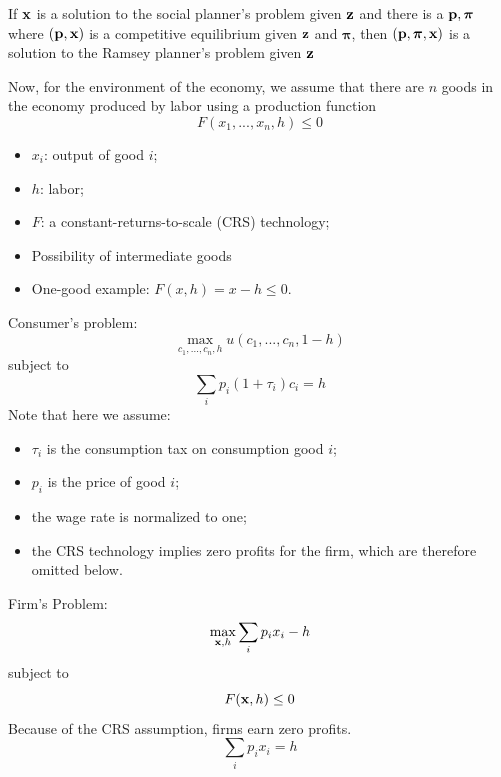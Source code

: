 \documentclass[12pt]{article}
\begin{document}
	\begin{proposition}
		If $\bold{x}$ is a solution to the social planner's problem given $\bold{z}$ and there is a $\bold{p}, \boldsymbol{\pi}$ where $(\bold{p}, \bold{x})$ is a competitive equilibrium given $\bold{z}$ and $\boldsymbol{\pi}$, then $(\bold{p}, \boldsymbol{\pi}, \bold{x})$ is a solution to the Ramsey planner's problem given $\bold{z}$
	\end{proposition}
	
	\noindent
	Now, for the environment of the economy, we assume that there are $n$ goods in the economy produced by labor using a production function
	\begin{equation*}
		F(x_1, ..., x_n, h) \leq 0
	\end{equation*}
	\begin{itemize}
			\item $x_i$: output of good $i$;
			\item $h$: labor;
			\item $F$: a constant-returns-to-scale (CRS) technology;
		\item Possibility of intermediate goods
			\item One-good example: $F(x, h) =x-h\leq 0$. 
	\end{itemize}
	
	\noindent
	Consumer's problem:
	\begin{equation} \label{eq:static_consumer_obj}
		\max_{c_1, ..., c_n, h} u(c_1, ..., c_n, 1-h)
	\end{equation}
	subject to
	\begin{equation} \label{eq:static_consumer_bc}
		\sum_{i} p_i(1+\tau_i) c_i = h
	\end{equation}
	Note that here we assume:
	\begin{itemize}
			\item $\tau_i$ is the consumption tax on consumption good $i$;
			\item $p_i$ is the price of good $i$;
			\item the wage rate is normalized to one;
			\item the CRS technology implies zero profits for the firm, which are therefore omitted below.
	\end{itemize}
	
	\noindent
	Firm's Problem:
	\begin{equation} \label{eq:static_firm_obj}
		\max_{\bold{x},h} \sum_{i}p_ix_i - h
	\end{equation}
	subject to
	\begin{equation} \label{eq:static_firm_prod}
		F(\bold{x}, h) \leq 0
	\end{equation}
		Because of the CRS assumption, firms earn zero profits.
	\begin{equation}
		\sum_i p_ix_i = h
	\end{equation}
	
\end{document}
